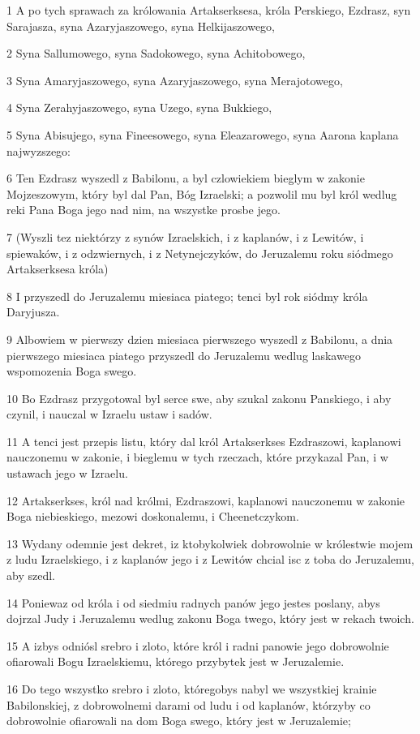 \par 1 A po tych sprawach za królowania Artakserksesa, króla Perskiego, Ezdrasz, syn Sarajasza, syna Azaryjaszowego, syna Helkijaszowego,
\par 2 Syna Sallumowego, syna Sadokowego, syna Achitobowego,
\par 3 Syna Amaryjaszowego, syna Azaryjaszowego, syna Merajotowego,
\par 4 Syna Zerahyjaszowego, syna Uzego, syna Bukkiego,
\par 5 Syna Abisujego, syna Fineesowego, syna Eleazarowego, syna Aarona kaplana najwyzszego:
\par 6 Ten Ezdrasz wyszedl z Babilonu, a byl czlowiekiem bieglym w zakonie Mojzeszowym, który byl dal Pan, Bóg Izraelski; a pozwolil mu byl król wedlug reki Pana Boga jego nad nim, na wszystke prosbe jego.
\par 7 (Wyszli tez niektórzy z synów Izraelskich, i z kaplanów, i z Lewitów, i spiewaków, i z odzwiernych, i z Netynejczyków, do Jeruzalemu roku siódmego Artakserksesa króla)
\par 8 I przyszedl do Jeruzalemu miesiaca piatego; tenci byl rok siódmy króla Daryjusza.
\par 9 Albowiem w pierwszy dzien miesiaca pierwszego wyszedl z Babilonu, a dnia pierwszego miesiaca piatego przyszedl do Jeruzalemu wedlug laskawego wspomozenia Boga swego.
\par 10 Bo Ezdrasz przygotowal byl serce swe, aby szukal zakonu Panskiego, i aby czynil, i nauczal w Izraelu ustaw i sadów.
\par 11 A tenci jest przepis listu, który dal król Artakserkses Ezdraszowi, kaplanowi nauczonemu w zakonie, i bieglemu w tych rzeczach, które przykazal Pan, i w ustawach jego w Izraelu.
\par 12 Artakserkses, król nad królmi, Ezdraszowi, kaplanowi nauczonemu w zakonie Boga niebieskiego, mezowi doskonalemu, i Cheenetczykom.
\par 13 Wydany odemnie jest dekret, iz ktobykolwiek dobrowolnie w królestwie mojem z ludu Izraelskiego, i z kaplanów jego i z Lewitów chcial isc z toba do Jeruzalemu, aby szedl.
\par 14 Poniewaz od króla i od siedmiu radnych panów jego jestes poslany, abys dojrzal Judy i Jeruzalemu wedlug zakonu Boga twego, który jest w rekach twoich.
\par 15 A izbys odniósl srebro i zloto, które król i radni panowie jego dobrowolnie ofiarowali Bogu Izraelskiemu, którego przybytek jest w Jeruzalemie.
\par 16 Do tego wszystko srebro i zloto, któregobys nabyl we wszystkiej krainie Babilonskiej, z dobrowolnemi darami od ludu i od kaplanów, którzyby co dobrowolnie ofiarowali na dom Boga swego, który jest w Jeruzalemie;
